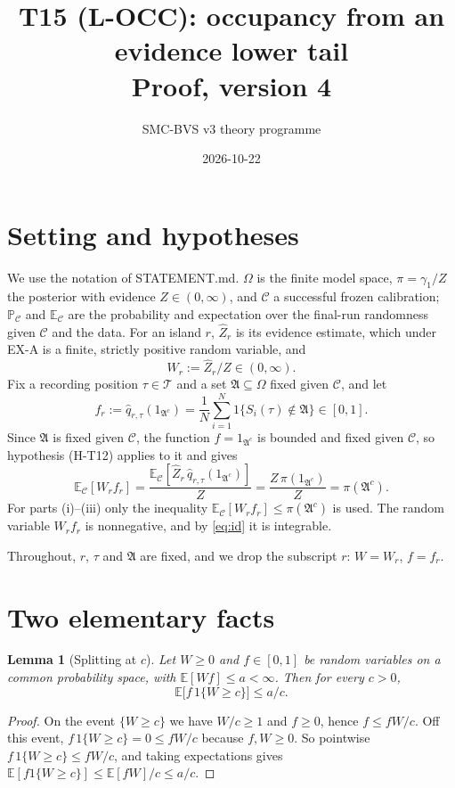 \documentclass[11pt]{article}
\title{T15 (L-OCC): occupancy from an evidence lower tail\\[2pt]\large Proof, version 4}
\author{SMC-BVS v3 theory programme}
\date{2026-10-22}
\newtheorem{lemma}{Lemma}
\theoremstyle{remark}
\newcommand{\Pc}{\mathbb{P}_{\mathcal C}}
\newcommand{\Ec}{\mathbb{E}_{\mathcal C}}
\newcommand{\A}{\mathfrak{A}}
\begin{document}
\maketitle

\section{Setting and hypotheses}

We use the notation of STATEMENT.md. $\Omega$ is the finite model space, $\pi=\gamma_1/Z$ the posterior with
evidence $Z\in(0,\infty)$, and $\mathcal C$ a successful frozen calibration; $\Pc$ and $\Ec$ are the probability and
expectation over the final-run randomness given $\mathcal C$ and the data. For an island $r$, $\hat Z_r$ is its
evidence estimate, which under EX-A is a finite, strictly positive random variable, and
\[
  W_r:=\hat Z_r/Z \in (0,\infty).
\]
Fix a recording position $\tau\in\mathcal T$ and a set $\A\subseteq\Omega$ fixed given $\mathcal C$, and let
\[
  f_r:=\hat q_{r,\tau}(1_{\A^c})=\frac1N\sum_{i=1}^N 1\{S_i(\tau)\notin\A\}\in[0,1].
\]
Since $\A$ is fixed given $\mathcal C$, the function $f=1_{\A^c}$ is bounded and fixed given $\mathcal C$, so
hypothesis (H-T12) applies to it and gives
\begin{equation}\label{eq:id}
  \Ec[W_r f_r]=\frac{\Ec[\hat Z_r\,\hat q_{r,\tau}(1_{\A^c})]}{Z}=\frac{Z\,\pi(1_{\A^c})}{Z}=\pi(\A^c).
\end{equation}
For parts (i)--(iii) only the inequality $\Ec[W_rf_r]\le\pi(\A^c)$ is used. The random variable $W_rf_r$ is
nonnegative, and by \eqref{eq:id} it is integrable.

Throughout, $r$, $\tau$ and $\A$ are fixed, and we drop the subscript $r$: $W=W_r$, $f=f_r$.

\section{Two elementary facts}

\begin{lemma}[Splitting at $c$]\label{lem:split}
Let $W\ge0$ and $f\in[0,1]$ be random variables on a common probability space, with $\mathbb E[Wf]\le a<\infty$.
Then for every $c>0$,
\[
  \mathbb E\big[f\,1\{W\ge c\}\big]\le a/c .
\]
\end{lemma}
\begin{proof}
On the event $\{W\ge c\}$ we have $W/c\ge1$ and $f\ge0$, hence $f\le fW/c$. Off this event,
$f\,1\{W\ge c\}=0\le fW/c$ because $f,W\ge0$. So pointwise
$f\,1\{W\ge c\}\le fW/c$, and taking expectations gives $\mathbb E[f1\{W\ge c\}]\le \mathbb E[fW]/c\le a/c$.
\end{proof}
\end{document}
